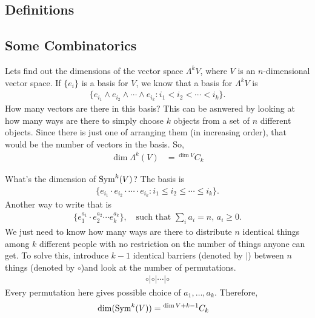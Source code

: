 \subsection{Definitions}
\label{sub:definitions}

\subsection{Some Combinatorics}
\label{sub:some_combinatorics}

Lets find out the dimensions of the vector space $\Lambda^k V$, where $V$ is an $n$-dimensional vector space.
If $\{e_i\}$ is a basis for $V$, we know that a basis for $\Lambda^k V$ is 
\begin{align}
    \{e_{i_1}\wedge e_{i_2} \wedge\cdots \wedge e_{i_k} : i_1 < i_2 < \cdots < i_k \}.
\end{align}
How many vectors are there in this basis? This can be asnwered by looking at how many ways are there to simply choose $k$ objects from a set of $n$ different objects. Since there is just one of arranging them (in increasing order), that would be the number of vectors in the basis. So,
\begin{align}
    \dim \Lambda^k (V) &= {}^{\dim V}C_k
    \label{eqn:dim_exteriorpower}
\end{align}

What's the dimension of $\operatorname{Sym}^k(V)$? The basis is
\begin{align}
    \{e_{i_1}\cdot e_{i_2} \cdot\cdots \cdot e_{i_k} : i_1 \leq i_2 \leq \cdots \leq i_k \}.
\end{align}
Another way to write that is
\begin{align}
    \{e_1^{a_1}\cdot e_2^{a_2} \cdots e_k^{a_k}\},\quad\text{such that } \sum_i a_i = n,\, a_i\geq 0.
\end{align}
We just need to know how many ways are there to distribute $n$ identical things among $k$ different people with no restriction on the number of things anyone can get. To solve this, introduce $k-1$ identical barriers (denoted by $|$) between $n$ things (denoted by $\circ$)and look at the number of permutations.
\begin{align}
    \circ | \circ | \cdots | \circ
\end{align}
Every permutation here gives possible choice of ${a_1,\dotsc,a_k}$. Therefore,
\begin{align}
    \dim (\operatorname{Sym}^k (V)) &= {}^{\dim V +k-1}C_{k}
    \label{eqn:dim_symmetricpower}
\end{align}


